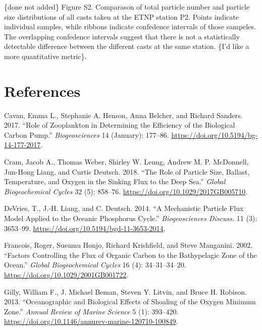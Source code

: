 \documentclass[]{article}
\begin{document}
\{done not added\} Figure S2. Comparason of total particle number and
particle size distributions of all casts taken at the ETNP station P2.
Points indicate individual samples, while ribbons indicate confedence
intervals of those sampeles. The overlapping confedence intervals
suggest that there is not a statistically detectable difference between
the different casts at the same station. \{I'd like a more quantitative
metric\}.

\hypertarget{references}{%
\section*{References}\label{references}}

\hypertarget{refs}{}
\leavevmode\hypertarget{ref-cavanRoleZooplanktonDetermining2017}{}%
Cavan, Emma L., Stephanie A. Henson, Anna Belcher, and Richard Sanders.
2017. ``Role of Zooplankton in Determining the Efficiency of the
Biological Carbon Pump.'' \emph{Biogeosciences} 14 (January): 177--86.
\url{https://doi.org/10.5194/bg-14-177-2017}.

\leavevmode\hypertarget{ref-cramRoleParticleSize2018}{}%
Cram, Jacob A., Thomas Weber, Shirley W. Leung, Andrew M. P. McDonnell,
Jun-Hong Liang, and Curtis Deutsch. 2018. ``The Role of Particle Size,
Ballast, Temperature, and Oxygen in the Sinking Flux to the Deep Sea.''
\emph{Global Biogeochemical Cycles} 32 (5): 858--76.
\url{https://doi.org/10.1029/2017GB005710}.

\leavevmode\hypertarget{ref-devriesMechanisticParticleFlux2014}{}%
DeVries, T., J.-H. Liang, and C. Deutsch. 2014. ``A Mechanistic Particle
Flux Model Applied to the Oceanic Phosphorus Cycle.''
\emph{Biogeosciences Discuss.} 11 (3): 3653--99.
\url{https://doi.org/10.5194/bgd-11-3653-2014}.

\leavevmode\hypertarget{ref-francoisFactorsControllingFlux2002}{}%
Francois, Roger, Susumu Honjo, Richard Krishfield, and Steve Manganini.
2002. ``Factors Controlling the Flux of Organic Carbon to the
Bathypelagic Zone of the Ocean.'' \emph{Global Biogeochemical Cycles} 16
(4): 34--31--34--20. \url{https://doi.org/10.1029/2001GB001722}.

\leavevmode\hypertarget{ref-gillyOceanographicBiologicalEffects2013}{}%
Gilly, William F., J. Michael Beman, Steven Y. Litvin, and Bruce H.
Robison. 2013. ``Oceanographic and Biological Effects of Shoaling of the
Oxygen Minimum Zone.'' \emph{Annual Review of Marine Science} 5 (1):
393--420. \url{https://doi.org/10.1146/annurev-marine-120710-100849}.
\end{document}
